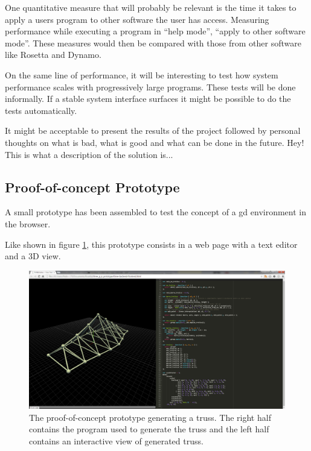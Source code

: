 \documentclass{./llncs2e/llncs}
\begin{document}
	One quantitative measure that will probably be relevant is the time it takes to apply a users program to other software the user has access.
	Measuring performance while executing a program in ``help mode'', ``apply to other software mode''. 
	These measures would then be compared with those from other software like Rosetta and Dynamo.

	On the same line of performance, it will be interesting to test how system performance scales with progressively large programs.
	These tests will be done informally. 
	If a stable system interface surfaces it might be possible to do the tests automatically.

	It might be acceptable to present the results of the project followed by personal thoughts on what is bad, what is good and what can be done in the future.
	Hey! This is what a description of the solution is...


\subsection{Proof-of-concept Prototype}
	A small prototype has been assembled to test the concept of a \ac{gd} environment in the browser.

	Like shown in figure \ref{fig:proto:3d:p:editor}, this prototype consists in a web page with a text editor and a 3D view.

	\begin{figure}
	  \centering
	  \includegraphics[width=1.0\textwidth]{img/proto_3d_p_editor}
	    \caption{The proof-of-concept prototype generating a truss. The right half contains the program used to generate the truss and the left half contains an interactive view of generated truss.}
	  \label{fig:proto:3d:p:editor}
	\end{figure} 
\end{document}

